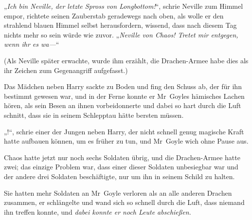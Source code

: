 „\emph{Ich bin Neville, der letzte Spross von Longbottom!}“, schrie Neville zum Himmel empor, richtete seinen Zauberstab geradewegs nach oben, als wolle er den strahlend blauen Himmel selbst herausfordern, wissend, dass nach diesem Tag nichts mehr so sein würde wie zuvor.
„\emph{Neville von Chaos! Tretet mir entgegen, wenn ihr es wa—}“

(Als Neville später erwachte, wurde ihm erzählt, die Drachen-Armee habe dies als ihr Zeichen zum Gegenangriff aufgefasst.)

\later

Das Mädchen neben Harry sackte zu Boden und fing den Schuss ab, der für ihn bestimmt gewesen war, und in der Ferne konnte er Mr~Goyles hämisches Lachen hören, als sein Besen an ihnen vorbeidonnerte und dabei so hart durch die Luft schnitt, dass sie in seinem Schlepptau hätte bersten müssen.

„!“, schrie einer der Jungen neben Harry, der nicht schnell genug magische Kraft hatte aufbauen können, um es früher zu tun, und Mr~Goyle wich ohne Pause aus.

Chaos hatte jetzt nur noch sechs Soldaten übrig, und die Drachen-Armee hatte zwei; das einzige Problem war, dass einer dieser Soldaten unbesiegbar war und der andere drei Soldaten beschäftigte, nur um ihn in seinem Schild zu halten.

Sie hatten mehr Soldaten an Mr~Goyle verloren als an alle anderen Drachen zusammen, er schlängelte und wand sich so schnell durch die Luft, dass niemand ihn treffen konnte, und \emph{dabei konnte er noch Leute abschießen.}

